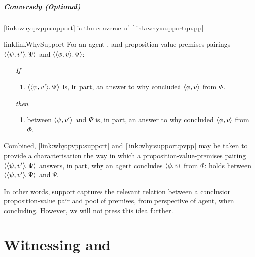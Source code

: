 \subparagraph[Conversely]{Conversely \hfill (Optional)}

\begin{noteP}
  \autoref{link:why:pvpp:support} is the converse of~\autoref{link:why:support:pvpp}:

  \begin{restatable}[]{link}{linkWhySupport}
    \label{link:why:pvpp:support}
    For an agent \vAgent{}, and proposition-value-premises pairings \(\langle \langle \psi, v' \rangle, \Psi \rangle\) and \(\langle \langle \phi, v \rangle, \Phi \rangle\):
    \begin{itemize}
    \item[\emph{If}]
      \begin{enumerate}[label=\alph*., ref=(\alph*)]
      \item
        \(\langle \langle \psi, v' \rangle, \Psi \rangle\) is, in part, an answer to why \vAgent{} concluded \(\langle \phi, v \rangle\) from \(\Phi\).
      \end{enumerate}
    \item[\emph{then}]
      \begin{enumerate}[label=\alph*., ref=(\alph*), resume]
      \item
         between \(\langle \psi, v' \rangle\) and \(\Psi\) is, in part, an answer to why \vAgent{} concluded \(\langle \phi, v \rangle\) from \(\Phi\).
      \end{enumerate}
    \end{itemize}
    \vspace{-\baselineskip}
  \end{restatable}

  Combined, \autoref{link:why:pvpp:support} and \autoref{link:why:support:pvpp} may be taken to provide a characterisation the way in which a proposition-value-premises pairing \(\langle \langle \psi, v' \rangle, \Psi \rangle\) answers, in part, why an agent concludes \(\langle \phi, v \rangle\) from \(\Phi\):
   holds between \(\langle \langle \psi, v' \rangle, \Psi \rangle\) and \(\Psi\).

  In other words, support captures the relevant relation between a conclusion proposition-value pair and pool of premises, from perspective of agent, when concluding.
  However, we will not press this idea further.
\end{noteP}

\section{Witnessing and \qHow{}}
\label{sec:overview:reasoning}
\label{cha:clar:expand:qHow}

